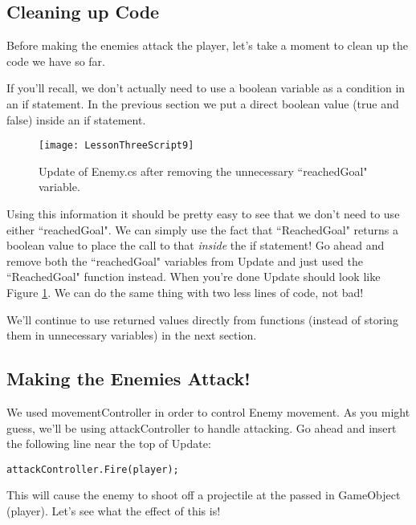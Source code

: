 \documentclass{article}
\begin{document}
\subsection{Cleaning up Code}

Before making the enemies attack the player, let's take a moment to clean up the code we have so far. 

If you'll recall, we don't actually need to use a boolean variable as a condition in an if statement. In the previous section we put a direct boolean value (true and false) inside an if statement. 

\begin{figure}
  \texttt{[image: LessonThreeScript9]}
  \caption{Update of Enemy.cs after removing the unnecessary ``reachedGoal" variable.}
  \label{fig:LessonThreeScript9}
\end{figure}

Using this information it should be pretty easy to see that we don't need to use either ``reachedGoal". We can simply use the fact that ``ReachedGoal" returns a boolean value to place the call to that \textit{inside} the if statement! Go ahead and remove both the ``reachedGoal" variables from Update and just used the ``ReachedGoal" function instead. When you're done Update should look like Figure \ref{fig:LessonThreeScript9}. We can do the same thing with two less lines of code, not bad!

We'll continue to use returned values directly from functions (instead of storing them in unnecessary variables) in the next section. 

\subsection{Making the Enemies Attack!}

We used movementController in order to control Enemy movement. As you might guess, we'll be using attackController to handle attacking. Go ahead and insert the following line near the top of Update: 

\lstset{style=sharpc}
\begin{lstlisting}
attackController.Fire(player);
\end{lstlisting}

This will cause the enemy to shoot off a projectile at the passed in GameObject (player). Let's see what the effect of this is!

\noindent{}
\end{document}
